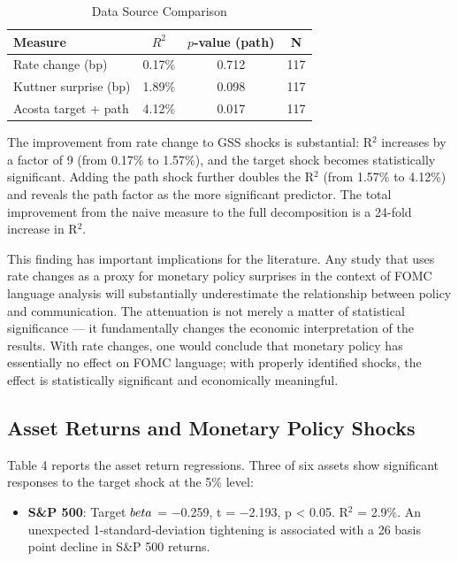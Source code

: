 \documentclass[12pt]{article}
\begin{document}
\begin{table}[htbp]\centering\caption{Data Source Comparison}\label{tab:comparison}
\begin{tabular}{lccc}\toprule
Measure & $R^2$ & $p$-value (path) & N \\\midrule
Rate change (bp) & 0.17\% & 0.712 & 117 \\
Kuttner surprise (bp) & 1.89\% & 0.098 & 117 \\
Acosta target + path & 4.12\% & 0.017 & 117 \\\bottomrule
\end{tabular}
\par\vspace{2pt}{\footnotesize All regressions include Newey-West HAC standard errors with lag=4.}
\end{table}

The improvement from rate change to GSS shocks is substantial: R$^2$ increases by a factor of 9 (from 0.17\% to 1.57\%), and the target shock becomes statistically significant. Adding the path shock further doubles the R$^2$ (from 1.57\% to 4.12\%) and reveals the path factor as the more significant predictor. The total improvement from the naive measure to the full decomposition is a 24-fold increase in R$^2$.

This finding has important implications for the literature. Any study that uses rate changes as a proxy for monetary policy surprises in the context of FOMC language analysis will substantially underestimate the relationship between policy and communication. The attenuation is not merely a matter of statistical significance --- it fundamentally changes the economic interpretation of the results. With rate changes, one would conclude that monetary policy has essentially no effect on FOMC language; with properly identified shocks, the effect is statistically significant and economically meaningful.

\subsection{Asset Returns and Monetary Policy Shocks}

Table 4 reports the asset return regressions. Three of six assets show significant responses to the target shock at the 5\% level:

\begin{itemize}
\item \textbf{S\&P 500}: Target $\\beta$ = $-$0.259, t = $-$2.193, p < 0.05. R$^2$ = 2.9\%. An unexpected 1-standard-deviation tightening is associated with a 26 basis point decline in S\&P 500 returns.
\end{itemize}
\end{document}

